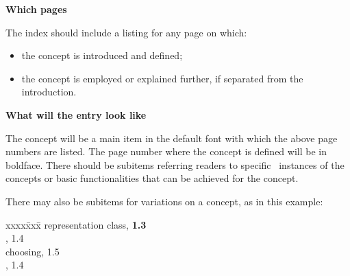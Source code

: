 \documentclass{article}
\newenvironment{indexex}{\begin{tabbing}
xxxx\=xxx\=\kill}{\end{tabbing}}
\begin{document}
\begin{description}
   \item{\bf Which pages}

         The index should include a listing for any page on which:
           \begin{itemize}
               \item the concept is introduced and defined;
               \item the concept is employed or explained
                     further, if separated from the introduction.
           \end{itemize}
   \item{\bf What will the entry look like}

        The concept will be a main item in the default font with which the 
        above page numbers
        are listed.  The page number where the concept is defined will be in
        boldface. There should be subitems referring readers to specific
        \cgal\ instances of the concepts or basic functionalities that
        can be achieved for the concept.  

        There may also be subitems for variations on a concept,  as in 
        this example:
        \begin{indexex}
        representation class,                                {\bf 1.3} \\
        \> ,                           1.4 \\
        \> choosing,                                               1.5 \\
        \> ,                         1.4 \\
        \end{indexex}


\end{description}
\end{document}
